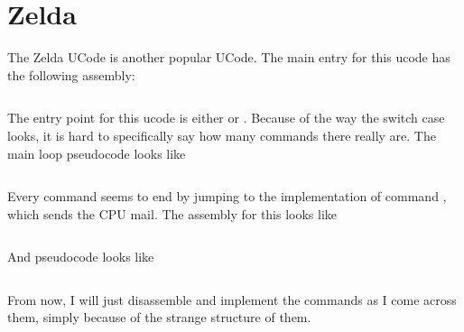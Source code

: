 \chapter{Zelda}

The Zelda UCode is another popular UCode. The main entry for this ucode has the following assembly:

\inputminted[fontsize=\small]{asm}{../zelda/main_loop.asm}

The entry point for this ucode is either  or . Because of the way the switch case looks, it is hard to specifically say how many commands there really are. The main loop pseudocode looks like 

\inputminted[]{c}{../zelda/main_loop.c}

Every command seems to end by jumping to the implementation of command , which sends the CPU mail. The assembly for this looks like 

\inputminted[fontsize=\small]{asm}{../zelda/command_0.asm}

And pseudocode looks like

\inputminted[]{c}{../zelda/command_0.c}

From now, I will just disassemble and implement the commands as I come across them, simply because of the strange structure of them.